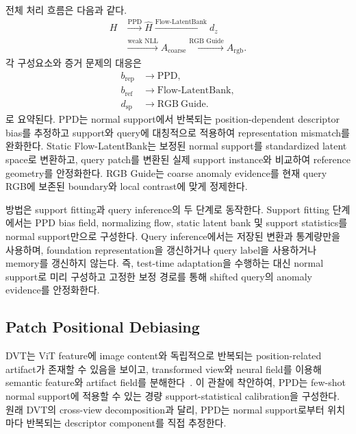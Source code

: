 전체 처리 흐름은 다음과 같다.
\begin{equation}
  \begin{aligned}
    H
      &\xrightarrow{\text{PPD}} \widehat H
       \xrightarrow{\text{Flow-LatentBank}} d_z \\
      &\xrightarrow{\text{weak NLL}} A_{\mathrm{coarse}}
       \xrightarrow{\text{RGB Guide}} A_{\mathrm{rgb}}.
  \end{aligned}
  \label{eq:pipeline}
\end{equation}
각 구성요소와 증거 문제의 대응은
\begin{equation}
  \begin{aligned}
    b_{\mathrm{rep}} &\longrightarrow \mathrm{PPD},\\
    b_{\mathrm{ref}} &\longrightarrow \mathrm{Flow\text{-}LatentBank},\\
    d_{\mathrm{sp}}  &\longrightarrow \mathrm{RGB\ Guide}.
  \end{aligned}
  \label{eq:problem_component_mapping}
\end{equation}
로 요약된다. PPD는 normal support에서 반복되는 position-dependent descriptor
bias를 추정하고 support와 query에 대칭적으로 적용하여 representation mismatch를
완화한다. Static Flow-LatentBank는 보정된 normal support를 standardized latent
space로 변환하고, query patch를 변환된 실제 support instance와 비교하여 reference
geometry를 안정화한다. RGB Guide는 coarse anomaly evidence를 현재 query RGB에
보존된 boundary와 local contrast에 맞게 정제한다.

방법은 support fitting과 query inference의 두 단계로 동작한다. Support fitting
단계에서는 PPD bias field, normalizing flow, static latent bank 및 support statistics를
normal support만으로 구성한다. Query inference에서는 저장된 변환과 통계량만을
사용하며, foundation representation을 갱신하거나 query label을 사용하거나 memory를
갱신하지 않는다. 즉, test-time adaptation을 수행하는 대신 normal support로 미리
구성하고 고정한 보정 경로를 통해 shifted query의 anomaly evidence를 안정화한다.

\subsection{Patch Positional Debiasing}
\label{sec:ppd}

DVT는 ViT feature에 image content와 독립적으로 반복되는 position-related
artifact가 존재할 수 있음을 보이고, transformed view와 neural field를 이용해
semantic feature와 artifact field를 분해한다~\cite{yang2024dvt}. 이 관찰에
착안하여, PPD는 few-shot normal support에 적용할 수 있는 경량
support-statistical calibration을 구성한다. 원래 DVT의 cross-view decomposition과
달리, PPD는 normal support로부터 위치마다 반복되는 descriptor component를 직접
추정한다.

